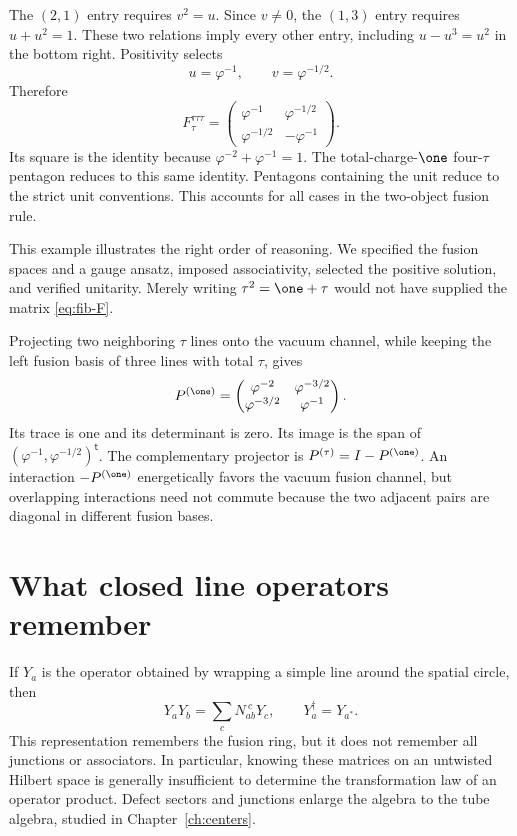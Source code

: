 The $(2,1)$ entry requires $v^2=u$.  Since $v\ne0$, the $(1,3)$
entry requires $u+u^2=1$.  These two relations imply every other
entry, including $u-u^3=u^2$ in the bottom right.  Positivity selects
\[
 u=\varphi^{-1},\qquad v=\varphi^{-1/2}.
\]
Therefore
\begin{equation}
 F^{\tau\tau\tau}_{\tau}
 =\begin{pmatrix}
 \varphi^{-1}&\varphi^{-1/2}\\
 \varphi^{-1/2}&-\varphi^{-1}
 \end{pmatrix}.
 \label{eq:fib-F}
\end{equation}
Its square is the identity because
$\varphi^{-2}+\varphi^{-1}=1$.  The total-charge-$\one$
four-$\tau$ pentagon reduces to this same identity.  Pentagons
containing the unit reduce to the strict unit conventions.  This
accounts for all cases in the two-object fusion rule.

This example illustrates the right order of reasoning.  We specified
the fusion spaces and a gauge ansatz, imposed associativity, selected
the positive solution, and verified unitarity.  Merely writing
$\tau^2=\one+\tau$ would not have supplied the matrix
\eqref{eq:fib-F}.

\begin{example}
Projecting two neighboring $\tau$ lines onto the vacuum channel,
while keeping the left fusion basis of three lines with total $\tau$,
gives
\[
 P^{(\one)}=
 \begin{pmatrix}
 \varphi^{-2}&\varphi^{-3/2}\\
 \varphi^{-3/2}&\varphi^{-1}
 \end{pmatrix}.
\]
Its trace is one and its determinant is zero.  Its image is the span
of $(\varphi^{-1},\varphi^{-1/2})^{\mathsf t}$.  The complementary
projector is $P^{(\tau)}=I-P^{(\one)}$.  An interaction
$-P^{(\one)}$ energetically favors the vacuum fusion channel, but
overlapping interactions need not commute because the two adjacent
pairs are diagonal in different fusion bases.
\end{example}

\section{What closed line operators remember}

If $Y_a$ is the operator obtained by wrapping a simple line around
the spatial circle, then
\begin{equation}
 Y_aY_b=\sum_cN_{ab}^{\ c}Y_c,
 \qquad Y_a^\dagger=Y_{a^*}.
 \label{eq:fusion-operator-algebra}
\end{equation}
This representation remembers the fusion ring, but it does not
remember all junctions or associators.  In particular, knowing these
matrices on an untwisted Hilbert space is generally insufficient to
determine the transformation law of an operator product.  Defect
sectors and junctions enlarge the algebra to the tube algebra, studied
in Chapter~\ref{ch:centers}.

